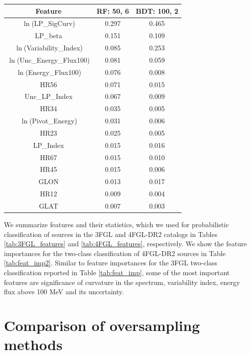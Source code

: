 \documentclass[referee]{aa} %
\newcommand{\lb}{\label}
\begin{document}
\begin{appendix}
\begin{table}[!h]
\tiny
\centering
\renewcommand{\tabcolsep}{1mm}
\renewcommand{\arraystretch}{1}

\begin{tabular}{c c c}
\hline
\hline
Feature & RF: 50, 6& BDT: 100, 2\\
\hline
{ $\ln$(LP\_SigCurv)}&  0.297  & 0.465   \\
{LP\_beta}&0.151&0.109\\
{ $\ln$(Variability\_Index)} &0.085& 0.253   \\
$\ln$(Unc\_Energy\_Flux100)& 0.081&0.059  \\
$\ln$(Energy\_Flux100) & 0.076&0.008   \\
HR56&0.071& 0.015  \\
Unc\_LP\_Index & 0.067&0.009  \\
HR34& 0.035&0.005  \\
$\ln$(Pivot\_Energy)&0.031&0.006\\
HR23 &0.025& 0.005     \\
 LP\_Index& 0.015&0.016  \\
HR67&0.015&0.010\\
HR45&0.015&0.006\\
GLON&0.013&0.017\\
HR12&0.009&0.004\\
GLAT&0.007&0.003\\
\hline
\end{tabular}
\end{table}



We summarize features and their statistics,
which we used for probabilistic classification of sources in the 3FGL and 4FGL-DR2 catalogs
in Tables \ref{tab:3FGL_features} and \ref{tab:4FGL_features}, respectively. 
We show the feature importances for the two-class classification of 4FGL-DR2 sources in Table \ref{tab:feat_imp2}.
Similar to feature importances for the 3FGL two-class classification reported in Table \ref{tab:feat_imp}, 
some of the most important features are significance of curvature in the spectrum, variability index, energy flux above 100 MeV and its uncertainty.

\section{Comparison of oversampling methods}
\lb{sec:app_O_vs_S}


\end{appendix}
\end{document}

